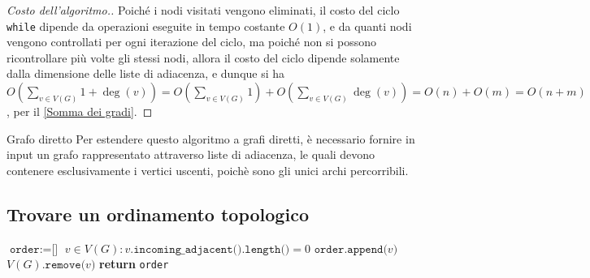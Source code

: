 \documentclass[a4paper, 12pt]{report}
\begin{document}
    \begin{proof}[Costo dell'algoritmo.]
        \label{costo FRN2}
        Poiché i nodi visitati vengono eliminati, il costo del ciclo \texttt{while} dipende da operazioni eseguite in tempo costante $O(1)$, e da quanti nodi vengono controllati per ogni iterazione del ciclo, ma poiché non si possono ricontrollare più volte gli stessi nodi, allora il costo del ciclo dipende solamente dalla dimensione delle liste di adiacenza, e dunque si ha $\displaystyle O\left( \sum_{v \in V(G)}{1 + \deg(v)}\right)=O\left(\sum_{v \in V(G)}{1}\right) + O\left(\sum_{v \in V(G)}{\deg(v)}\right) = O(n) + O(m) = O(n+ m)$, per il \cref{Somma dei gradi}.
    \end{proof}

    \begin{framedobs}{Grafo diretto}
        Per estendere questo algoritmo a grafi diretti, è necessario fornire in input un grafo rappresentato attraverso liste di adiacenza, le quali devono contenere esclusivamente i vertici uscenti, poichè sono gli unici archi percorribili.
    \end{framedobs}

    \subsection{Trovare un ordinamento topologico}

    \begin{algorithm}[H]
        \caption{
            Dato un grafo diretto aciclico $G$, l'algoritmo restituisce un suo ordinamento topologico.\\
            \textbf{Input}: $G$ grafo diretto aciclico.\\
            \textbf{Output}: un ordinamento topologico di $G$.
        }

        \begin{algorithmic}[1]
                \State $\texttt{order} := \texttt{[}\texttt{]}$
                    \State $v \in V(G) : v.\texttt{incoming\_adjacent().length()} = 0$
                    \State $\texttt{order.append(}v\texttt{)}$
                    \State $V(G)\texttt{.remove(}v\texttt{)}$
                \EndWhile
                \State \textbf{return} \texttt{order}
            \EndFunction
        \end{algorithmic}
    \end{algorithm}
\end{document}
